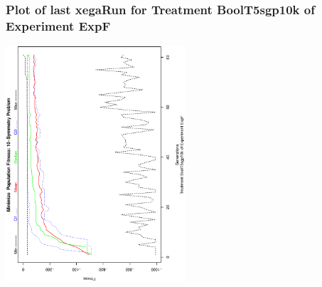 \begin{frame}
 \frametitle{ Plot of last xegaRun for Treatment BoolT5sgp10k of Experiment ExpF }
 \begin{center}
\includegraphics[width=0.5\textwidth, angle=-90]
{ExpFPlotPopStatsFigure008.eps}
 \end{center}
 \label{report/ExpFPlotPopStatsFigure008.eps}  
 \end{frame}

